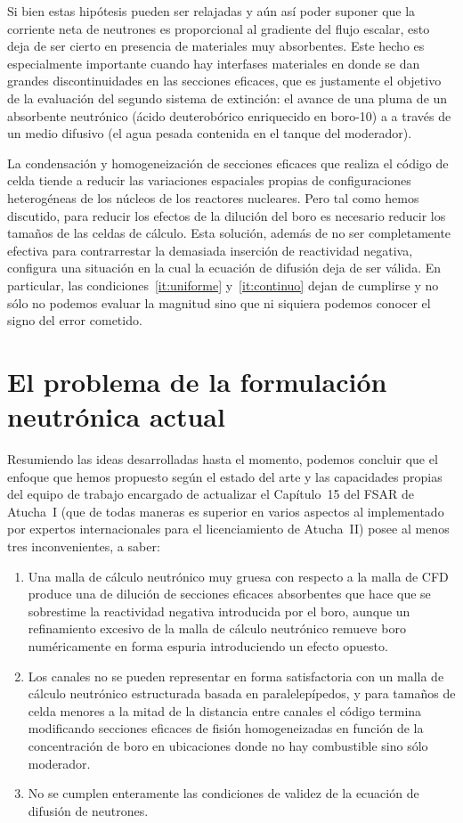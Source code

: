 Si bien estas hipótesis pueden ser relajadas y aún así poder suponer que la corriente neta de neutrones es proporcional al gradiente del flujo escalar, esto deja de ser cierto en presencia de materiales muy absorbentes. Este hecho es especialmente importante cuando hay interfases materiales en donde se dan grandes discontinuidades en las secciones eficaces, que es justamente el objetivo de la evaluación del segundo sistema de extinción: el avance de una pluma de un absorbente neutrónico (ácido deuterobórico enriquecido en boro-10) a a través de un medio difusivo (el agua pesada contenida en el tanque del moderador). 

La condensación y homogeneización de secciones eficaces que realiza el código de celda tiende a reducir las variaciones espaciales propias de configuraciones heterogéneas de los núcleos de los reactores nucleares. Pero tal como hemos discutido, para reducir los efectos de la dilución del boro es necesario reducir los tamaños de las celdas de cálculo. Esta solución, además de no ser completamente efectiva para contrarrestar la demasiada inserción de reactividad negativa, configura una situación en la cual la ecuación de difusión deja de ser válida. En particular, las condiciones~\ref{it:uniforme} y~\ref{it:continuo} dejan de cumplirse y no sólo no podemos evaluar la magnitud sino que ni siquiera podemos conocer el signo del error cometido. 

\section{El problema de la formulación neutrónica actual} %
\label{sec:problemdesc}

Resumiendo las ideas desarrolladas hasta el momento, podemos concluir que el enfoque que hemos propuesto según el estado del arte y las capacidades propias del equipo de trabajo encargado de actualizar el Capítulo~15 del FSAR de Atucha~I (que de todas maneras es superior en varios aspectos al implementado por expertos internacionales para el licenciamiento de Atucha~II) posee al menos tres inconvenientes, a saber:

\begin{enumerate}
 \item Una malla de cálculo neutrónico muy gruesa con respecto a la malla de CFD produce una de dilución de secciones eficaces absorbentes que hace que se sobrestime la reactividad negativa introducida por el boro, aunque un refinamiento excesivo de la malla de cálculo neutrónico remueve boro numéricamente en forma espuria introduciendo un efecto opuesto.
 \item Los canales no se pueden representar en forma satisfactoria con un malla de cálculo neutrónico estructurada basada en paralelepípedos, y para tamaños de celda menores a la mitad de la distancia entre canales el código termina modificando secciones eficaces de fisión homogeneizadas en función de la concentración de boro en ubicaciones donde no hay combustible sino sólo moderador.
 \item No se cumplen enteramente las condiciones de validez de la ecuación de difusión de neutrones.
\end{enumerate}

